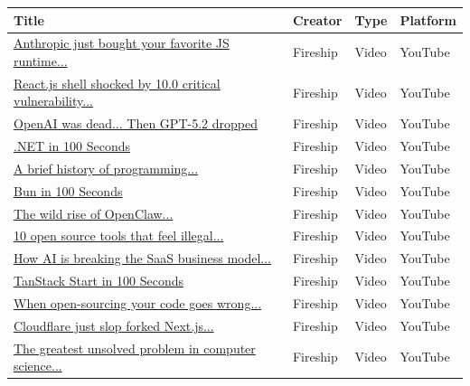 \documentclass[12pt]{article}
\begin{document}
            \setlength{\tabcolsep}{4pt}
            \begin{longtable}{p{} p{} p{} p{}}
            \hline
            \textbf{Title} & \textbf{Creator} & \textbf{Type} & \textbf{Platform} \\
            \hline
            \endhead
            \hline
            \endfoot
            \href{https://www.youtube.com/watch?v=5JMiNsV7P3Y}{Anthropic just bought your favorite JS runtime...} & Fireship & Video & YouTube \\[2pt]
            \href{https://www.youtube.com/watch?v=QLK9G5zyU-Q}{React.js shell shocked by 10.0 critical vulnerability...} & Fireship & Video & YouTube \\[2pt]
            \href{https://www.youtube.com/watch?v=rEvEXQvo-F8}{OpenAI was dead... Then GPT-5.2 dropped} & Fireship & Video & YouTube \\[2pt]
            \href{https://www.youtube.com/watch?v=MFsYaRnrcPQ}{.NET in 100 Seconds} & Fireship & Video & YouTube \\[2pt]
            \href{https://www.youtube.com/watch?v=9uW6B9LPntY}{A brief history of programming...} & Fireship & Video & YouTube \\[2pt]
            \href{https://www.youtube.com/watch?v=M4TufsFlv_o}{Bun in 100 Seconds} & Fireship & Video & YouTube \\[2pt]
            \href{https://www.youtube.com/watch?v=ssYt09bCgUY}{The wild rise of OpenClaw...} & Fireship & Video & YouTube \\[2pt]
            \href{https://www.youtube.com/watch?v=Ukt2gVz25PQ}{10 open source tools that feel illegal...} & Fireship & Video & YouTube \\[2pt]
            \href{https://www.youtube.com/watch?v=cxcb55zr2Q8}{How AI is breaking the SaaS business model...} & Fireship & Video & YouTube \\[2pt]
            \href{https://www.youtube.com/watch?v=1fUBWAETmkk}{TanStack Start in 100 Seconds} & Fireship & Video & YouTube \\[2pt]
            \href{https://www.youtube.com/watch?v=wzzh7Not8XE}{When open-sourcing your code goes wrong...} & Fireship & Video & YouTube \\[2pt]
            \href{https://www.youtube.com/watch?v=abbeIUOCzmw}{Cloudflare just slop forked Next.js...} & Fireship & Video & YouTube \\[2pt]
            \href{https://www.youtube.com/watch?v=x36UmiSiEzc}{The greatest unsolved problem in computer science...} & Fireship & Video & YouTube \\[2pt]

\end{longtable}
\end{document}
